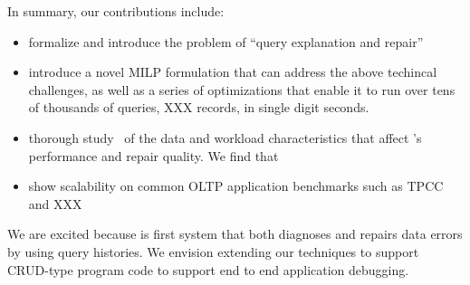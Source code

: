 In summary, our contributions include:
\begin{itemize}[leftmargin=*, topsep=0mm, itemsep=0mm]      
    \item formalize and introduce the problem of “query explanation and repair”
    \item introduce a novel MILP formulation that can address the above techincal challenges, as well as a series of optimizations that enable it to run over tens of thousands of queries, XXX records, in single digit seconds.
    \item thorough study~\cite{techreport} of the data and workload characteristics that affect \sys's performance and repair quality.  We find that
    \item show scalability on common OLTP application benchmarks such as TPCC and XXX
\end{itemize}

We are excited because \sys is first system that both diagnoses and repairs data errors by using query histories.
We envision extending our techniques to support CRUD-type program code to support end to end application debugging.

